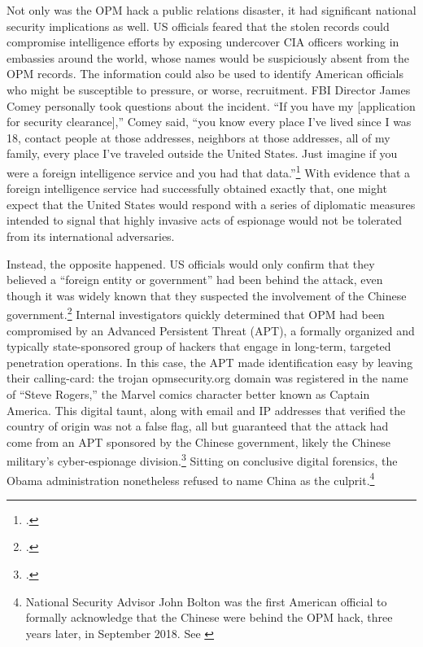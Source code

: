 \documentclass[14pt]{extarticle}
\begin{document}
Not only was the OPM hack a public relations disaster, it had significant national security implications as well. US officials feared that the stolen records could compromise intelligence efforts by exposing undercover CIA officers working in embassies around the world, whose names would be suspiciously absent from the OPM records. The information could also be used to identify American officials who might be susceptible to pressure, or worse, recruitment. FBI Director James Comey personally took questions about the incident. ``If you have my [application for security clearance],'' Comey said, ``you know every place I've lived since I was 18, contact people at those addresses, neighbors at those addresses, all of my family, every place I've traveled outside the United States. Just imagine if you were a foreign intelligence service and you had that data.''\footcite{nakashima_hacks_2015} With evidence that a foreign intelligence service had successfully obtained exactly that, one might expect that the United States would respond with a series of diplomatic measures intended to signal that highly invasive acts of espionage would not be tolerated from its international adversaries.

Instead, the opposite happened. US officials would only confirm that they believed a \enquote{foreign entity or government} had been behind the attack, even though it was widely known that they suspected the involvement of the Chinese government.\footcite{spetalnick_china_2015} Internal investigators quickly determined that OPM had been compromised by an Advanced Persistent Threat (APT), a formally organized and typically state-sponsored group of hackers that engage in long-term, targeted penetration operations. In this case, the APT made identification easy by leaving their calling-card: the trojan opmsecurity.org domain was registered in the name of \enquote{Steve Rogers,} the Marvel comics character better known as Captain America. This digital taunt, along with email and IP addresses that verified the country of origin was not a false flag, all but guaranteed that the attack had come from an APT sponsored by the Chinese government, likely the Chinese military's cyber-espionage division.\footcite{koerner_inside_2016} Sitting on conclusive digital forensics, the Obama administration nonetheless refused to name China as the culprit.\footnote{National Security Advisor John Bolton was the first American official to formally acknowledge that the Chinese were behind the OPM hack, three years later, in September 2018. See \cite{sanger_trump_2018}}
\end{document}
